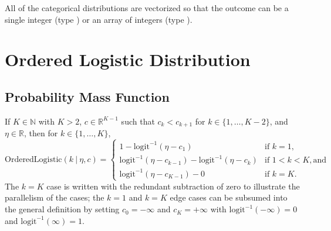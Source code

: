 \begin{description}
{\begin{description}
All of the categorical distributions are vectorized so that the outcome  can be a single integer (type ) or an array of integers (type ).


\begin{description}     \end{description}


\begin{description}  \end{description}


\begin{description}  \end{description}


\section{Ordered Logistic Distribution}


\subsection{Probability Mass Function}


If $K \in \mathbb{N}$ with $K > 2$, $c \in \mathbb{R}^{K-1}$ such that $c_k < c_{k+1}$ for $k \in \{1,\ldots,K-2\}$, and $\eta \in \mathbb{R}$, then for $k \in \{1,\ldots,K\}$, \[ \text{OrderedLogistic}(k~|~\eta,c) = \left\{ \begin{array}{ll} 1 - \text{logit}^{-1}(\eta - c_1)  &  \text{if } k = 1, \\[4pt] \text{logit}^{-1}(\eta - c_{k-1}) - \text{logit}^{-1}(\eta - c_{k})  &  \text{if } 1 < k < K, \text{and} \\[4pt] \text{logit}^{-1}(\eta - c_{K-1}) - 0  &  \text{if } k = K. \end{array} \right. \] The $k=K$ case is written with the redundant subtraction of zero to illustrate the parallelism of the cases; the $k=1$ and $k=K$ edge cases can be subsumed into the general definition by setting $c_0 = -\infty$ and $c_K = +\infty$ with $\text{logit}^{-1}(-\infty) = 0$ and $\text{logit}^{-1}(\infty) = 1$.



\end{description}}
\end{description}
